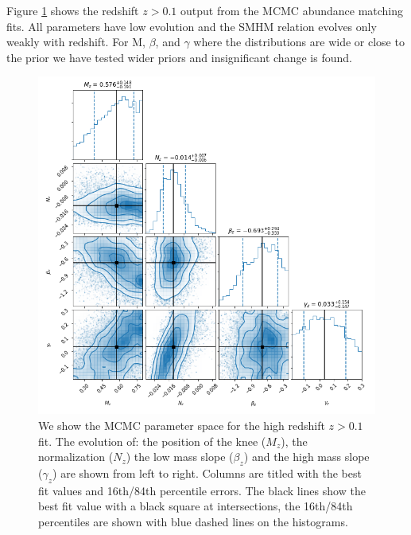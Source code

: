 Figure \ref{fig:MCMC_hz} shows the redshift $z > 0.1$ output from the MCMC abundance matching fits. All parameters have low evolution and the SMHM relation evolves only weakly with redshift. For M, $\beta$, and $\gamma$ where the distributions are wide  or close to the prior we have tested wider priors and insignificant change is found.

\begin{figure}
	\centering
	\includegraphics[width = \linewidth]{MCMC_plot_hz.png}
    \caption{We show the MCMC parameter space for the high redshift $z > 0.1$ fit. The evolution of: the position of the knee ($M_z$), the normalization ($N_z$) the low mass slope ($\beta_z$) and the high mass slope ($\gamma_z$) are shown from left to right. Columns are titled with the best fit values and 16th/84th percentile errors. The black lines show the best fit value with a black square at intersections, the 16th/84th percentiles are shown with blue dashed lines on the histograms.}
	\label{fig:MCMC_hz}
\end{figure}